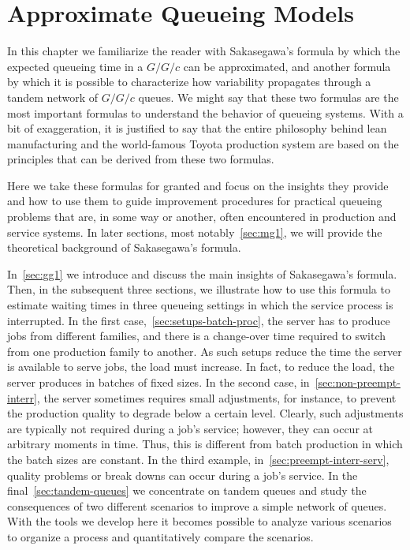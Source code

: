 





\chapter{Approximate Queueing Models}
\label{cha:approximate-models}



In this chapter we familiarize the reader with Sakasegawa's formula by which the expected queueing time in a $G/G/c$ can be approximated, and another formula by which it is possible to characterize how variability propagates through a tandem network of $G/G/c$ queues.
We might say that these two formulas are the most important formulas to understand the behavior of queueing systems.
With a bit of exaggeration, it is justified to say that the entire philosophy behind lean manufacturing and the world-famous Toyota production system are based on the principles that can be derived from these two formulas.

Here we take these formulas for granted and focus on the insights they provide and how to use them to guide improvement procedures for practical queueing problems that are, in some way or another, often encountered in production and service systems.
In later sections, most notably~\cref{sec:mg1}, we will provide the theoretical background of Sakasegawa's formula.


In~\cref{sec:gg1} we introduce and discuss the main insights of Sakasegawa's formula.
Then, in the subsequent three sections, we illustrate how to use this formula to estimate waiting times in three queueing settings in which the service process is interrupted.
In the first case,~\cref{sec:setups-batch-proc}, the server has to produce jobs from different families, and there is a change-over time required to switch from one production family to another.
As such setups reduce the time the server is available to serve jobs, the load must increase.
In fact, to reduce the load, the server produces in batches of fixed sizes.
In the second case, in~\cref{sec:non-preempt-interr}, the server sometimes requires small adjustments, for instance, to prevent the production quality to degrade below a certain level.
Clearly, such adjustments are typically not required during a job's service; however, they can occur at arbitrary moments in time.
Thus, this is different from batch production in which the batch sizes are constant.
In the third example, in~\cref{sec:preempt-interr-serv}, quality problems or break downs can occur during a job's service.
In the final~\cref{sec:tandem-queues} we concentrate on tandem queues and study the consequences of two different scenarios to improve a simple network of queues.
With the tools we develop here it becomes possible to analyze various scenarios to organize a process and quantitatively compare the scenarios.

